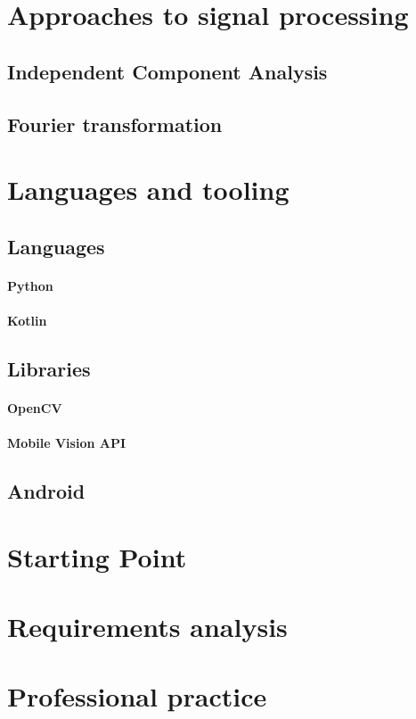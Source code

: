 \section{Approaches to signal processing}
\subsection{Independent Component Analysis}
\subsection{Fourier transformation}


\section{Languages and tooling}
\subsection{Languages}
\paragraph{Python}
\paragraph{Kotlin}

\subsection{Libraries}
\paragraph{OpenCV}
\paragraph{Mobile Vision API}

\subsection{Android}

\section{Starting Point}

\section{Requirements analysis}


\section{Professional practice}
